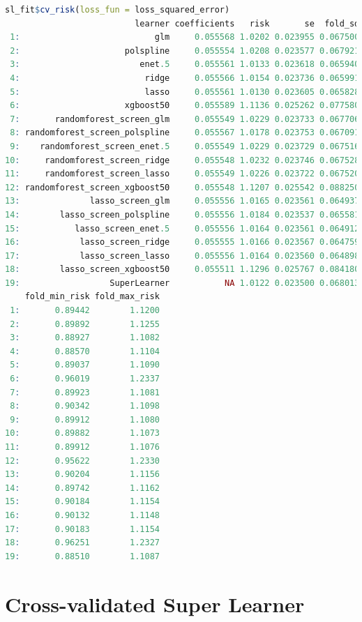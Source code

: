 \documentclass[
  12pt, krantz2,
]{book}
\theoremstyle{definition}
\theoremstyle{definition}
\theoremstyle{definition}
\newcommand{\1}{\mathbbm{1}}
\begin{document}
\begin{lstlisting}[language=R]
sl_fit$cv_risk(loss_fun = loss_squared_error)
                          learner coefficients   risk       se  fold_sd
 1:                           glm     0.055568 1.0202 0.023955 0.067500
 2:                     polspline     0.055554 1.0208 0.023577 0.067921
 3:                        enet.5     0.055561 1.0133 0.023618 0.065940
 4:                         ridge     0.055566 1.0154 0.023736 0.065991
 5:                         lasso     0.055561 1.0130 0.023605 0.065828
 6:                     xgboost50     0.055589 1.1136 0.025262 0.077580
 7:       randomforest_screen_glm     0.055549 1.0229 0.023733 0.067706
 8: randomforest_screen_polspline     0.055567 1.0178 0.023753 0.067091
 9:    randomforest_screen_enet.5     0.055549 1.0229 0.023729 0.067516
10:     randomforest_screen_ridge     0.055548 1.0232 0.023746 0.067528
11:     randomforest_screen_lasso     0.055549 1.0226 0.023722 0.067520
12: randomforest_screen_xgboost50     0.055548 1.1207 0.025542 0.088250
13:              lasso_screen_glm     0.055556 1.0165 0.023561 0.064937
14:        lasso_screen_polspline     0.055556 1.0184 0.023537 0.065581
15:           lasso_screen_enet.5     0.055556 1.0164 0.023561 0.064912
16:            lasso_screen_ridge     0.055555 1.0166 0.023567 0.064759
17:            lasso_screen_lasso     0.055556 1.0164 0.023560 0.064898
18:        lasso_screen_xgboost50     0.055511 1.1296 0.025767 0.084180
19:                  SuperLearner           NA 1.0122 0.023500 0.068013
    fold_min_risk fold_max_risk
 1:       0.89442        1.1200
 2:       0.89892        1.1255
 3:       0.88927        1.1082
 4:       0.88570        1.1104
 5:       0.89037        1.1090
 6:       0.96019        1.2337
 7:       0.89923        1.1081
 8:       0.90342        1.1098
 9:       0.89912        1.1080
10:       0.89882        1.1073
11:       0.89912        1.1076
12:       0.95622        1.2330
13:       0.90204        1.1156
14:       0.89742        1.1162
15:       0.90184        1.1154
16:       0.90132        1.1148
17:       0.90183        1.1154
18:       0.96251        1.2327
19:       0.88510        1.1087
\end{lstlisting}

\hypertarget{cross-validated-super-learner}{%
\section*{Cross-validated Super Learner}\label{cross-validated-super-learner}}
\end{document}
